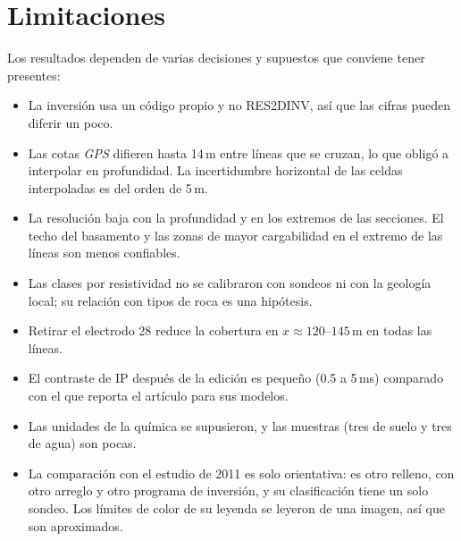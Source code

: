 \documentclass[conference]{IEEEtran}
\newcommand{\gps}{\textit{GPS}}
\begin{document}
\section{Limitaciones}
Los resultados dependen de varias decisiones y supuestos que conviene tener presentes:
\begin{itemize}
\item La inversión usa un código propio y no RES2DINV, así que las cifras pueden diferir un poco.
\item Las cotas \gps{} difieren hasta 14\,m entre líneas que se cruzan, lo que obligó a interpolar en profundidad. La incertidumbre horizontal de las celdas interpoladas es del orden de 5\,m.
\item La resolución baja con la profundidad y en los extremos de las secciones. El techo del basamento y las zonas de mayor cargabilidad en el extremo de las líneas son menos confiables.
\item Las clases por resistividad no se calibraron con sondeos ni con la geología local; su relación con tipos de roca es una hipótesis.
\item Retirar el electrodo 28 reduce la cobertura en $x\approx120$--$145$\,m en todas las líneas.
\item El contraste de IP después de la edición es pequeño (0.5 a 5\,ms) comparado con el que reporta el artículo para sus modelos.
\item Las unidades de la química se supusieron, y las muestras (tres de suelo y tres de agua) son pocas.
\item La comparación con el estudio de 2011 es solo orientativa: es otro relleno, con otro arreglo y otro programa de inversión, y su clasificación tiene un solo sondeo. Los límites de color de su leyenda se leyeron de una imagen, así que son aproximados.
\end{itemize}
\end{document}
